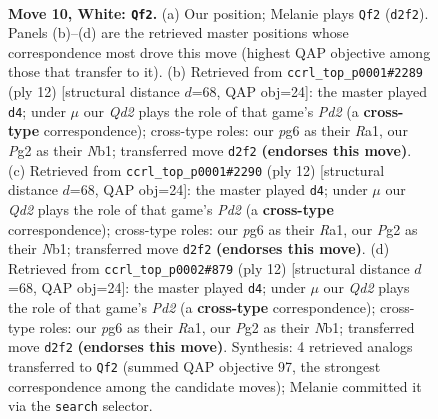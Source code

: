 \documentclass[11pt]{article}
\begin{document}
\clearpage

\begin{figure}[p]\centering
\begin{subfigure}{0.46\textwidth}\centering
\resizebox{\linewidth}{!}{%
\newchessgame
\chessboard[
  setfen={r2qk2r/pp1bppbp/n2p2p1/7n/3NP3/2N1BP2/PPPQ2PP/2KR1B1R w kq - 5 10},
  showmover=false,
  pgfstyle=straightmove, color=movearrow, markmove={d2-f2}
]}
\caption{}
\end{subfigure}\hfill
\begin{subfigure}{0.46\textwidth}\centering
\resizebox{\linewidth}{!}{%
\newchessgame
\chessboard[
  setfen={r2qkbnr/1ppb1p1p/p1np2p1/4p3/B3P3/2P2N2/PP1P1PPP/RNBQ1RK1 w kq - 0 7},
  showmover=false,
  pgfstyle=straightmove, color=movearrow, markmove={d2-d4}
]}
\caption{}
\end{subfigure}
\\[4pt]
\begin{subfigure}{0.46\textwidth}\centering
\resizebox{\linewidth}{!}{%
\newchessgame
\chessboard[
  setfen={r2qkbnr/1ppb1p1p/p1np2p1/4p3/B3P3/2P2N2/PP1P1PPP/RNBQ1RK1 w kq - 0 7},
  showmover=false,
  pgfstyle=straightmove, color=movearrow, markmove={d2-d4}
]}
\caption{}
\end{subfigure}\hfill
\begin{subfigure}{0.46\textwidth}\centering
\resizebox{\linewidth}{!}{%
\newchessgame
\chessboard[
  setfen={r2qkbnr/1ppb1p1p/p1np2p1/4p3/B3P3/2P2N2/PP1P1PPP/RNBQ1RK1 w kq - 0 7},
  showmover=false,
  pgfstyle=straightmove, color=movearrow, markmove={d2-d4}
]}
\caption{}
\end{subfigure}
\caption{\textbf{Move 10, White: \texttt{Qf2}.} (a) Our position; Melanie plays \texttt{Qf2} (\texttt{d2f2}). Panels (b)--(d) are the retrieved master positions whose correspondence most drove this move (highest QAP objective among those that transfer to it). (b) Retrieved from \texttt{ccrl\_top\_p0001\#2289} (ply 12) [structural distance $d$=68, QAP obj=24]: the master played \texttt{d4}; under $\mu$ our \emph{Qd2} plays the role of that game's \emph{Pd2} (a \textbf{cross-type} correspondence); cross-type roles: our \emph{p}g6 as their \emph{R}a1, our \emph{P}g2 as their \emph{N}b1; transferred move \texttt{d2f2} \textbf{(endorses this move)}. (c) Retrieved from \texttt{ccrl\_top\_p0001\#2290} (ply 12) [structural distance $d$=68, QAP obj=24]: the master played \texttt{d4}; under $\mu$ our \emph{Qd2} plays the role of that game's \emph{Pd2} (a \textbf{cross-type} correspondence); cross-type roles: our \emph{p}g6 as their \emph{R}a1, our \emph{P}g2 as their \emph{N}b1; transferred move \texttt{d2f2} \textbf{(endorses this move)}. (d) Retrieved from \texttt{ccrl\_top\_p0002\#879} (ply 12) [structural distance $d$=68, QAP obj=24]: the master played \texttt{d4}; under $\mu$ our \emph{Qd2} plays the role of that game's \emph{Pd2} (a \textbf{cross-type} correspondence); cross-type roles: our \emph{p}g6 as their \emph{R}a1, our \emph{P}g2 as their \emph{N}b1; transferred move \texttt{d2f2} \textbf{(endorses this move)}. Synthesis: 4 retrieved analogs transferred to \texttt{Qf2} (summed QAP objective 97, the strongest correspondence among the candidate moves); Melanie committed it via the \texttt{search} selector.}

\end{figure}
\end{document}
